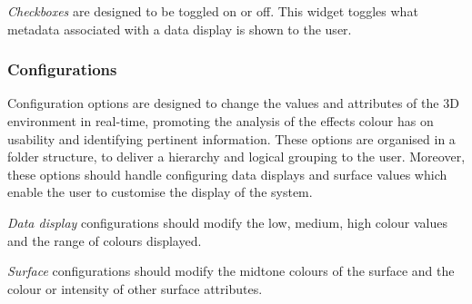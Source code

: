 {{{			\emph{Checkboxes} are designed to be toggled on or off. This widget toggles what metadata associated with a data display is shown to the user.

		}

		\subsubsection{Configurations} {
		\label{sec:configurations}

			Configuration options are designed to change the values and attributes of the 3D environment in real-time, promoting the analysis of the effects colour has on usability and identifying pertinent information. These options are organised in a folder structure, to deliver a hierarchy and logical grouping to the user. Moreover, these options should handle configuring data displays and surface values which enable the user to customise the display of the system.

			\emph{Data display} configurations should modify the low, medium, high colour values and the range of colours displayed.

			\emph{Surface} configurations should modify the midtone colours of the surface and the colour or intensity of other surface attributes.

		}

	}

}

